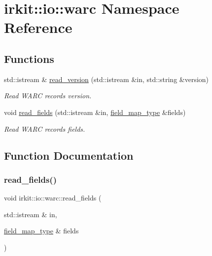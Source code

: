 \hypertarget{namespaceirkit_1_1io_1_1warc}{}\section{irkit\+:\+:io\+:\+:warc Namespace Reference}
\label{namespaceirkit_1_1io_1_1warc}
\subsection*{Functions}
\begin{DoxyCompactItemize}
\item 
std\+::istream \& \mbox{\hyperlink{namespaceirkit_1_1io_1_1warc_a09893fe6fcb5dc9474474aa904c510d2}{read\+\_\+version}} (std\+::istream \&in, std\+::string \&version)
\begin{DoxyCompactList}\small\item\em Read W\+A\+RC record\textquotesingle{}s version. \end{DoxyCompactList}\item 
void \mbox{\hyperlink{namespaceirkit_1_1io_1_1warc_aef4327721bee95960da11fd934327169}{read\+\_\+fields}} (std\+::istream \&in, \mbox{\hyperlink{namespaceirkit_1_1io_a3293145f3599deb5abb1ec2ed6d2c2ae}{field\+\_\+map\+\_\+type}} \&fields)
\begin{DoxyCompactList}\small\item\em Read W\+A\+RC record\textquotesingle{}s fields. \end{DoxyCompactList}\end{DoxyCompactItemize}


\subsection{Function Documentation}
\mbox{\label{namespaceirkit_1_1io_1_1warc_aef4327721bee95960da11fd934327169}} 
\subsubsection{\texorpdfstring{read\+\_\+fields()}{read\_fields()}}
{\footnotesize\ttfamily void irkit\+::io\+::warc\+::read\+\_\+fields (\begin{DoxyParamCaption}\item[{std\+::istream \&}]{in,  }\item[{\mbox{\hyperlink{namespaceirkit_1_1io_a3293145f3599deb5abb1ec2ed6d2c2ae}{field\+\_\+map\+\_\+type}} \&}]{fields }\end{DoxyParamCaption})}



